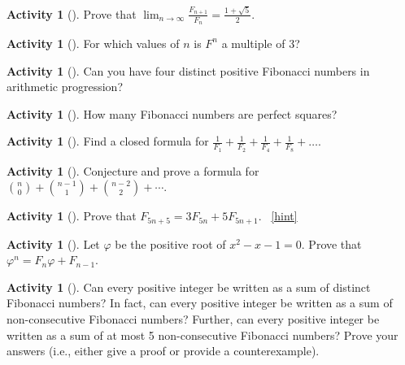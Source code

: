 \documentclass[10pt,]{book}
\theoremstyle{plain}
\theoremstyle{definition}
\theoremstyle{definition}
\theoremstyle{definition}
\newtheorem{activity}[project]{Activity}
\numberwithin{equation}{chapter}
\begin{document}
\begin{activity}[]\label{activity-101}
\hypertarget{p-547}{}%
Prove that \(\lim_{n\to\infty}\frac{F_{n + 1}}{F_{n}} = \frac{1 + \sqrt{5}}{2}.\)%
\end{activity}
\begin{activity}[]\label{activity-102}
\hypertarget{p-548}{}%
For which values of \(n\) is \(F^{n}\) a multiple of 3?%
\end{activity}
\begin{activity}[]\label{activity-103}
\hypertarget{p-549}{}%
Can you have four distinct positive Fibonacci numbers in arithmetic progression?%
\end{activity}
\begin{activity}[]\label{activity-104}
\hypertarget{p-550}{}%
How many Fibonacci numbers are perfect squares?%
\end{activity}
\begin{activity}[]\label{activity-105}
\hypertarget{p-551}{}%
Find a closed formula for \(\frac{1}{F_{1}} + \frac{1}{F_{2}} + \frac{1}{F_{4}} + \frac{1}{F_{8}} + \ldots.\)%
\end{activity}
\begin{activity}[]\label{activity-106}
\hypertarget{p-552}{}%
Conjecture and prove a formula for \(\binom{n}{0} + \binom{n-1}{1} + \binom{n-2}{2} + \cdots\).%
\end{activity}
\begin{activity}[]\label{activity-107}
\hypertarget{p-553}{}%
Prove that \(F_{5n + 5} = 3F_{5n} + 5F_{5n + 1}\).%
~\hfill{\tiny\hyperlink{a-107}{[hint]}\hypertarget{q-107}{}}\end{activity}
\begin{activity}[]\label{activity-108}
\hypertarget{p-555}{}%
Let \(\varphi\) be the positive root of \(x^{2} - x - 1 = 0\). Prove that \(\varphi^{n} = F_{n}\varphi + F_{n - 1}\).%
\end{activity}
\begin{activity}[]\label{activity-109}
\hypertarget{p-556}{}%
Can every positive integer be written as a sum of distinct Fibonacci numbers?  In fact, can every positive integer be written as a sum of non-consecutive Fibonacci numbers?  Further, can every positive integer be written as a sum of at most 5 non-consecutive Fibonacci numbers?  Prove your answers (i.e., either give a proof or provide a counterexample).%
\end{activity}
\typeout{************************************************}
\typeout{************************************************}
\end{document}
